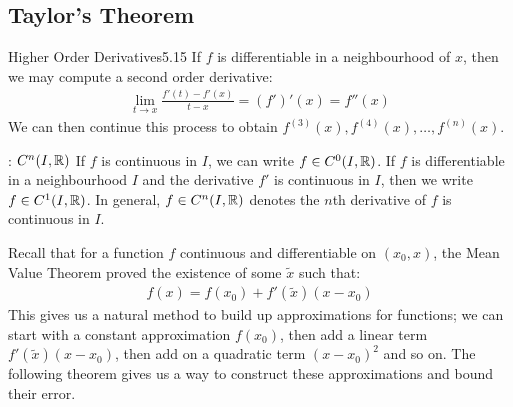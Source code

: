 \subsection{Taylor's Theorem}
\setcounter{rudin}{14}
\begin{definition}{Higher Order Derivatives}{5.15}
If $f$ is differentiable in a neighbourhood of $x$, then we may compute a second order derivative:
\begin{align*}
    \lim_{t \rightarrow x} \frac{f'(t) - f'(x)}{t - x} = (f')'(x) = f''(x)
\end{align*}
We can then continue this process to obtain $f^{(3)}(x), f^{(4)}(x), \ldots, f^{(n)}(x)$. 
\end{definition}
\begin{ndef}{: \texorpdfstring{$C^n(I, \mathbb{R})$}{Cn(I, R)}}{}
    If $f$ is continuous in $I$, we can write $f \in C^{0}(I, \mathbb{R})$. If $f$ is differentiable in a neighbourhood $I$ and the derivative $f'$ is continuous in $I$, then we write $f \in C^{1}(I, \mathbb{R})$. In general, $f \in C^{n}(I, \mathbb{R})$ denotes the $n$th derivative of $f$ is continuous in $I$. 
\end{ndef}
\noindent Recall that for a function $f$ continuous and differentiable on $(x_0, x)$, the Mean Value Theorem proved the existence of some $\tilde{x}$ such that:
\begin{align*}
    f(x) = f(x_0) + f'(\tilde{x})(x - x_0)
\end{align*}
This gives us a natural method to build up approximations for functions; we can start with a constant approximation $f(x_0)$, then add a linear term $f'(\tilde{x})(x - x_0)$, then add on a quadratic term $(x - x_0)^2$ and so on. The following theorem gives us a way to construct these approximations and bound their error.

